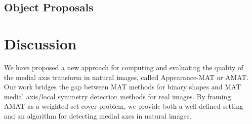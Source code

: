 \documentclass[10pt,twocolumn,letterpaper]{article}
\begin{document}
\subsection{Object Proposals}\label{sec:experiments:proposals}




\section{Discussion}\label{sec:discussion}
We have proposed a new approach for computing and evaluating the quality of the medial axis transform in 
natural images, called Appearance-MAT or AMAT.
Our work bridges the gap between MAT methods for binary shapes and MAT medial axis/local symmetry detection methods
for real images.
By framing AMAT as a weighted set cover problem, we provide both a well-defined setting and an algorithm for 
detecting medial axes in natural images.



{\small


}
\end{document}
